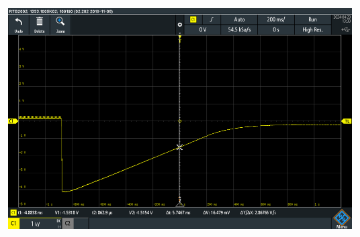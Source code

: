 \begin{figure}
\begin{subfigure}{0.48\columnwidth}
		\label{fig:oscilloscope-raw-p80-d80}
	\end{subfigure}
	\begin{subfigure}{0.48\columnwidth}
		\centering
		\includegraphics[width=0.8\linewidth]{src/figures/oscilloscope-raw/p80-d100.png}
		\label{fig:oscilloscope-raw-p80-d100}
	\end{subfigure}

\end{figure}

